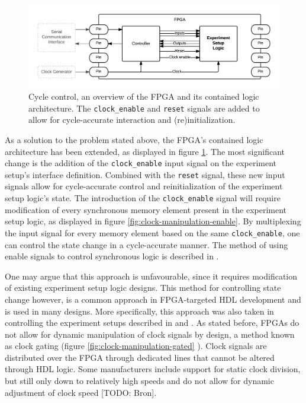\documentclass[openright]{template/uva-bachelor-thesis}
\begin{document}
\begin{figure}[h]
\centering
\includegraphics[width=\textwidth]{img/fpga-control}
\caption{Cycle control, an overview of the FPGA and its contained logic architecture. The \texttt{clock\_enable} and \texttt{reset} signals are added to allow for cycle-accurate interaction and (re)initialization.}
\label{fig:fpga-control}
\end{figure}

As a solution to the problem stated above, the FPGA's contained logic architecture has been extended, as displayed in figure \ref{fig:fpga-control}. The most significant change is the addition of the \texttt{clock\_enable} input signal on the experiment setup's interface definition. Combined with the \texttt{reset} signal, these new input signals allow for cycle-accurate control and reinitialization of the experiment setup logic's state. The introduction of the \texttt{clock\_enable} signal will require modification of every synchronous memory element present in the experiment setup logic, as displayed in figure \ref{fig:clock-manipulation-enable}. By multiplexing the input signal for every memory element based on the same \texttt{clock\_enable}, one can control the state change in a cycle-accurate manner. The method of using enable signals to control synchronous logic is described in \cite[Sec 2.4.5]{arora2011art}.

One may argue that this approach is unfavourable, since it requires modification of existing experiment setup logic designs. This method for controlling state change however, is a common approach in FPGA-targeted HDL development and is used in many designs. More specifically, this approach was also taken in controlling the experiment setups described in \cite{holland2003harnessing} and \cite{bulic2013fpga}. As stated before, FPGAs do not allow for dynamic manipulation of clock signals by design, a method known as clock gating (figure \ref{fig:clock-manipulation-gated} ). Clock signals are distributed over the FPGA through dedicated lines that cannot be altered through HDL logic. Some manufacturers include support for static clock division, but still only down to relatively high speeds and do not allow for dynamic adjustment of clock speed [TODO: Bron]. 
\end{document}
